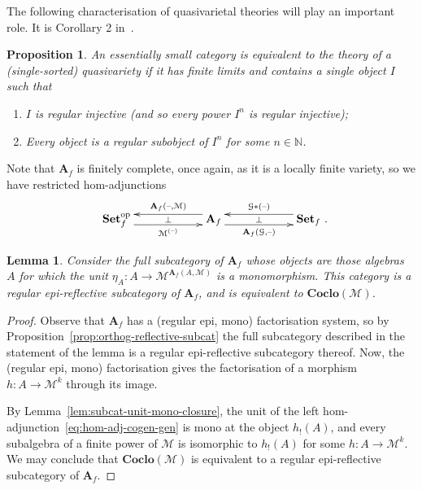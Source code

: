 \documentclass[11pt, a4paper, twoside,leqno]{amsart}
\newcommand{\cat}[1]{\mathbf{#1}}
\newcommand{\thg}{{\mathord{\text{--}}}}
\newcommand{\cd}[2][]{\vcenter{\hbox{\xymatrix#1{#2}}}}
\numberwithin{equation}{section}
\theoremstyle{plain}
\newtheorem{Prop}[Thm]{Proposition}
\newtheorem{Lemma}[Thm]{Lemma}
\theoremstyle{definition}
\newcommand{\Set}{\cat{Set}}
\begin{document}
The
following characterisation of quasivarietal theories will play an important role.
It is Corollary 2 in~\cite{Adamek:1998aa}.
\begin{Prop}
  \label{prop:qv-flt}
  An essentially small category is equivalent to the theory of a (single-sorted)
  quasivariety if it has finite limits and contains a single object
  \(I\) such that
  \begin{enumerate}[label=(\roman*), ref=(\roman*)]
  \item
    \label{it:qv-reg-inj}
\(I\) is regular injective (and so every power \(I^{n}\) is
    regular injective);
  \item
    \label{it:qv-reg-subobj}
Every object is a regular subobject of \(I^{n}\) for some
    \(n \in \mathbb{N}\).
  \end{enumerate}
\end{Prop}


Note that \(\cat{A}_{f}\) is finitely complete, once again, as it is a
locally finite variety, so we have restricted hom-adjunctions
\begin{equation}
  \label{eq:hom-adj-cogen-gen}
  \xymatrixcolsep{5pc}
  \xymatrixrowsep{3.5pc}
  \cd{
    {\Set_{f}^{\mathrm{op}}}
    \ar@<-4.5pt>[r]_-{\mathcal{M}^{(\thg)}} \ar@{<-}@<4.5pt>[r]^-{\cat{A}_{f}(\thg,\mathcal{M})} \ar@{}[r]|-{\bot} &
    {\cat{A}_{f}}
    \ar@<-4.5pt>[r]_-{\cat{A}_{f}(\mathcal{G}, \thg)} \ar@{<-}@<4.5pt>[r]^-{\mathcal{G}\ast (\thg)} \ar@{}[r]|-{\bot} &
    {\Set_{f}}
    \rlap{ .}
  }
\end{equation}



\begin{Lemma}
  \label{lem:coclo-reg-epi-reflect-subcat}
  Consider the full subcategory of \(\cat{A}_{f}\) whose objects are
  those algebras \(A\) for which the unit \(\eta_{A} \colon A \rightarrow \mathcal{M}^{\cat{A}_{f}(A,\mathcal{M})}\)
  is a monomorphism. This category is a regular epi-reflective
  subcategory of \(\cat{A}_{f}\), and is equivalent to \(\cat{Coclo(\mathcal{M})}\).
\end{Lemma}

\begin{proof}
  Observe that \(\cat{A}_{f}\) has a (regular epi, mono) factorisation
  system, so by Proposition~\ref{prop:orthog-reflective-subcat}
   the full
  subcategory described in the statement of the lemma is a regular
  epi-reflective subcategory thereof.
  Now, the (regular epi, mono) factorisation gives the factorisation of a morphism \(h \colon A \rightarrow
  \mathcal{M}^{k}\) through its image.

  By Lemma~\ref{lem:subcat-unit-mono-closure}, the unit of the left
  hom-adjunction~\eqref{eq:hom-adj-cogen-gen} is mono at the object \(h_{!}(A)\), and
  every subalgebra of a finite power of \(\mathcal{M}\) is isomorphic
  to \(h_{!}(A)\) for some \(h \colon A \rightarrow
  \mathcal{M}^{k}\). We may conclude that 
  \(\cat{Coclo(\mathcal{M})}\) is equivalent to a regular
  epi-reflective subcategory of \(\cat{A}_{f}\).
\end{proof}
\end{document}
